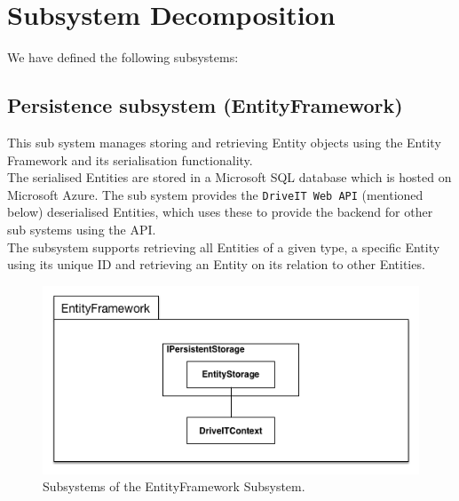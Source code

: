 \section{Subsystem Decomposition}
We have defined the following subsystems:
\subsection{Persistence subsystem (EntityFramework)} 
This sub system manages storing and retrieving Entity objects using the Entity Framework and its serialisation functionality.\\
The serialised Entities are stored in a Microsoft SQL database which is hosted on Microsoft Azure. The sub system provides the \texttt{DriveIT Web API} (mentioned below) deserialised Entities, which uses these to provide the backend for other sub systems using the API.\\
The subsystem supports retrieving all Entities of a given type, a specific Entity using its unique ID and retrieving an Entity on its relation to other Entities. 
\begin{figure}[H]
	\centering
	\includegraphics[width=\textwidth]{Figures/EntityFrameworkSubsystemDecomposition}
	\caption{Subsystems of the EntityFramework Subsystem.}
\end{figure}

